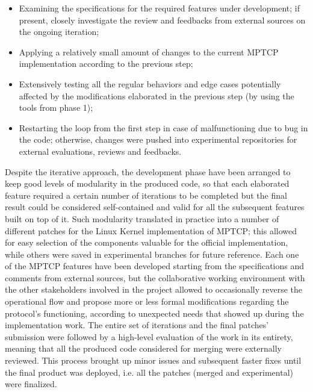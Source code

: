 \begin{itemize}
    \item Examining the specifications for the required features under development; if present, closely investigate the review and feedbacks from external sources on the ongoing iteration;
    \item Applying a relatively small amount of changes to the current MPTCP implementation according to the previous step;
    \item Extensively testing all the regular behaviors and edge cases potentially affected by the modifications elaborated in the previous step (by using the tools from phase 1);
    \item Restarting the loop from the first step in case of malfunctioning due to bug in the code; otherwise, changes were pushed into experimental repositories for external evaluations, reviews and feedbacks.
\end{itemize}

Despite the iterative approach, the development phase have been arranged to keep good levels of modularity in the produced code, so that each elaborated feature required a certain number of iterations to be completed but the final result could be considered self-contained and valid for all the subsequent features built on top of it. 
Such modularity translated in practice into a number of different patches for the Linux Kernel implementation of MPTCP; this allowed for easy selection of the components valuable for the official implementation, while others were saved in experimental branches for future reference.
Each one of the MPTCP features have been developed starting from the specifications and comments from external sources, but the collaborative working environment with the other stakeholders involved in the project allowed to occasionally reverse the operational flow and propose more or less formal modifications regarding the protocol's functioning, according to unexpected needs that showed up during the implementation work.
The entire set of iterations and the final patches' submission were followed by a high-level evaluation of the work in its entirety, meaning that all the produced code considered for merging were externally reviewed. This process brought up minor issues and subsequent faster fixes until the final product was deployed, i.e. all the patches (merged and experimental) were finalized. 

